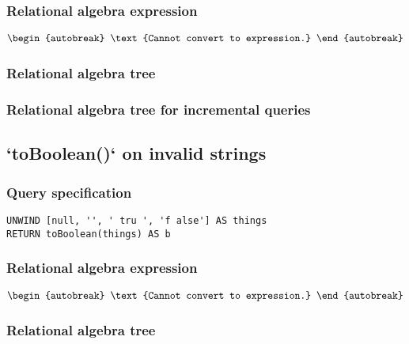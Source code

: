 \subsubsection*{Relational algebra expression}

\begin{align*}
\begin{autobreak}
\text{Cannot convert to expression.}
\end{autobreak}
\end{align*}

\subsubsection*{Relational algebra tree}


\subsubsection*{Relational algebra tree for incremental queries}


\subsection{`toBoolean()` on invalid strings}

\subsubsection*{Query specification}

\begin{lstlisting}
UNWIND [null, '', ' tru ', 'f alse'] AS things
RETURN toBoolean(things) AS b
\end{lstlisting}

\subsubsection*{Relational algebra expression}

\begin{align*}
\begin{autobreak}
\text{Cannot convert to expression.}
\end{autobreak}
\end{align*}

\subsubsection*{Relational algebra tree}

